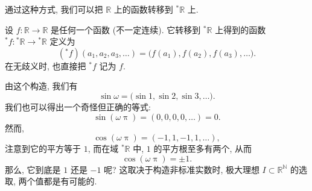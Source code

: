 




通过这种方式, 我们可以把 $\mathbb{R}$ 上的函数转移到 $^* \mathbb{R}$ 上.

\begin{construction}
    设 $f \colon \mathbb{R} \to \mathbb{R}$
    是任何一个函数 (不一定连续).
    它转移到 $^* \mathbb{R}$ 上得到的函数
    $^* f \colon {}^* \mathbb{R} \to {}^* \mathbb{R}$
    定义为
    \[
        (^* f) (a_1, a_2, a_3, \dotsc) =
        \bigl( f (a_1), f (a_2), f (a_3), \dotsc \bigr) .
    \]
    在无歧义时, 也直接把 $^* f$ 记为 $f$.
\end{construction}

\begin{example}
    由这个构造, 我们有
    \[
        \sin \omega =
        \bigl( \sin 1, \sin 2, \sin 3, \dotsc \bigr).
    \]
    我们也可以得出一个奇怪但正确的等式:
    \[
        \sin (\omega \uppi) = (0, 0, 0, 0, \dotsc) = 0.
    \]
    然而,
    \[
        \cos (\omega \uppi) = (-1, 1, -1, 1, \dotsc),
    \]
    注意到它的平方等于 $1$, 而在域 $^* \mathbb{R}$ 中, $1$ 的平方根至多有两个, 从而
    \[
        \cos (\omega \uppi) = \pm 1.
    \]
    那么, 它到底是 $1$ 还是 $-1$ 呢?
    这取决于构造非标准实数时,
    极大理想 $I \subset \mathbb{R}^{\mathbb{N}}$ 的选取,
    两个值都是有可能的.
\end{example}

